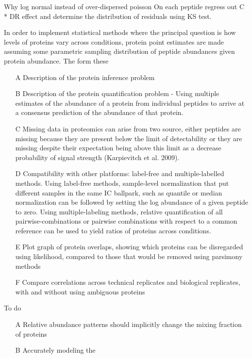 \documentclass[12pt]{article}
\begin{document}
Why log normal instead of over-dispersed poisson On each peptide regress out C * DR effect and
determine the distribution of residuals using KS test.

In order to implement statistical methods where the principal question is how levels of proteins vary
across conditions, protein point estimates are made assuming some parametric sampling distribution
of peptide abundances given protein abundance. The form these

\begin{itemize}
\item[A] Description of the protein inference problem
\item[B] Description of the protein quantification problem - Using multiple estimates of the abundance of a protein from individual peptides to arrive at a consensus prediction of the abundance of that protein.
\item[C] Missing data in proteomics can arise from two source, either peptides are missing because they are present below the limit of detectability or they are missing despite their expectation being above this limit as a decrease probability of signal strength (Karpievitch et al. 2009).
\item[D] Compatibility with other platforms: label-free and multiple-labelled methods. Using label-free methods, sample-level normalization that put different samples in the same IC ballpark, such as quantile or median normalization can be followed by setting the log abundance of a given peptide to zero. Using multiple-labeling methods, relative quantification of all pairwise-combinations or pairwise combinations with respect to a common reference can be used to yield ratios of proteins across conditions.
\item[E] Plot graph of protein overlaps, showing which proteins can be disregarded using likelihood, compared to those that would be removed using parsimony methods
\item[F] Compare correlations across technical replicates and biological replicates, with and without using ambiguous proteins
\end{itemize}

\color{red}
To do
\begin{itemize}
\item[A] Relative abundance patterns should implicitly change the mixing fraction of proteins
\item[B] Accurately modeling the
\end{itemize}
\color{black}
\end{document}
